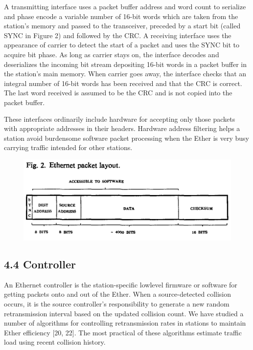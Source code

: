 A transmitting interface uses a packet buffer address and word count to serialize and phase encode a variable number of 16-bit words which are taken from the station's memory and passed to the transceiver, preceded by a start bit (called SYNC in Figure 2) and followed by the CRC. A receiving interface uses the appearance of carrier to detect the start of a packet and uses the SYNC bit to acquire bit phase. As long as carrier stays on, the interface decodes and deserializes the incoming bit stream depositing 16-bit words in a packet buffer in the station's main memory. When carrier goes away, the interface checks that an integral number of 16-bit words has been received and that the CRC is correct. The last word received is assumed to be the CRC and is not copied into the packet buffer.

These interfaces ordinarily include hardware for accepting only those packets with appropriate addresses in their headers. Hardware address filtering helps a station avoid burdensome software packet processing when the Ether is very busy carrying traffic intended for other stations.


\vspace{\fill} \pagebreak

%
\vspace{-6pt}

\begin{figure}[h!]
\centering
  \includegraphics[trim =0mm 0mm 0mm 0mm, clip, width=\columnwidth]{Figures/Ethernet-Fig-2.png} %
\end{figure}

\subsection*{4.4 Controller}

An Ethernet controller is the station-specific lowlevel firmware or software for getting packets onto and out of the Ether. When a source-detected collision occurs, it is the source controller's responsibility to generate a new random retransmission interval based on the updated collision count. We have studied a number of algorithms for controlling retransmission rates in stations to maintain Ether efficiency [20, 22]. The most practical of these algorithms estimate traffic load using recent collision history.

